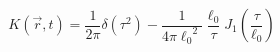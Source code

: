 \begin{equation}\label{rw5c}
K(\vec r,t) = \frac{1}{2\pi}\delta\left(\tau^2\right)-
\frac{1}{4\pi{\ell_{0}}^{2}}
\frac{\ell_{0}}{\tau}
J_{1}\left(\frac{\tau}{\ell_{0}}\right)
\end{equation}


